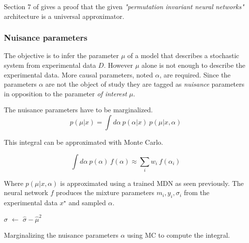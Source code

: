 
Section 7 of \cite{lucas:hal-01791126} gives a proof that the given \emph{"permutation invariant neural networks"} architecture is a universal approximator.



\subsubsection{Nuisance parameters}

The objective is to infer the parameter $\mu$ of a model that describes a stochastic system from experimental data $D$.
However $\mu$ alone is not enough to describe the experimental data.
More causal parameters, noted $\alpha$, are required.
Since the parameters $\alpha$ are not the object of study they are tagged as \emph{nuisance} parameters in opposition to the parameter \emph{of interest} $\mu$.

The nuisance parameters have to be marginalized.
\begin{equation}
    p(\mu | x) = \int d\alpha ~ p(\alpha | x) ~ p(\mu | x, \alpha)
\end{equation}

This integral can be approximated with Monte Carlo.

\begin{equation}
  \int d\alpha ~ p(\alpha) ~ f(\alpha)
  \approx \sum_i w_i ~ f(\alpha_i)
\end{equation}

Where $p(\mu | x, \alpha)$ is approximated using a trained MDN as seen previously.
The neural network $f$ produces the mixture parameters $m_i, y_i, \sigma_i$ from the experimental data $x^\star$ and sampled $\alpha$.

\begin{algorithm}[H]
$\hat\sigma$  $\gets$ $\hat\sigma - \hat\mu^2$ \;
\caption{Marginalizing the nuisance parameters $\alpha$ using MC to compute the integral.}
\end{algorithm}



